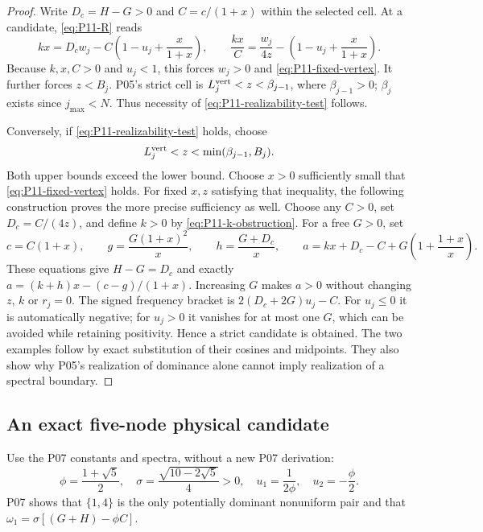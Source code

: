 \documentclass[11pt]{article}
\theoremstyle{definition}
\theoremstyle{remark}
\begin{document}
\begin{proof}
Write $D_c=H-G>0$ and $C=c/(1+x)$ within the selected cell.
At a candidate, \eqref{eq:P11-R} reads
\begin{equation}
 kx=D_cw_j-C\left(1-u_j+\frac{x}{1+x}\right),\qquad
 \frac{kx}{C}=\frac{w_j}{4z}-\left(1-u_j+\frac{x}{1+x}\right).
 \label{eq:P11-k-obstruction}
\end{equation}
Because $k,x,C>0$ and $u_j<1$, this forces $w_j>0$ and
\eqref{eq:P11-fixed-vertex}. It further forces $z<B_j$.
P05's strict cell is
$L_j^{\rm vert}<z<\beta_{j-1}$, where $\beta_{j-1}>0$;
$\beta_j$ exists since $j_{\max}<N$. Thus necessity of
\eqref{eq:P11-realizability-test} follows.

Conversely, if \eqref{eq:P11-realizability-test} holds, choose
\[
 L_j^{\rm vert}<z<\min(\beta_{j-1},B_j).
\]
Both upper bounds exceed the lower bound. Choose $x>0$ sufficiently
small that \eqref{eq:P11-fixed-vertex} holds. For fixed $x,z$
satisfying that inequality, the following construction proves the more
precise sufficiency as well. Choose any $C>0$, set $D_c=C/(4z)$,
and define $k>0$ by \eqref{eq:P11-k-obstruction}. For a free $G>0$,
set
\begin{equation}
 c=C(1+x),\qquad g=\frac{G(1+x)^2}{x},\qquad
 h=\frac{G+D_c}{x},\qquad
 a=kx+D_c-C+G\left(1+\frac{1+x}{x}\right).
 \label{eq:P11-realization}
\end{equation}
These equations give $H-G=D_c$ and exactly
$a=(k+h)x-(c-g)/(1+x)$. Increasing $G$ makes $a>0$
without changing $z$, $k$ or $r_j=0$. The signed frequency bracket
is $2(D_c+2G)u_j-C$. For $u_j\le0$ it is automatically negative;
for $u_j>0$ it vanishes for at most one $G$, which can be avoided
while retaining positivity. Hence a strict candidate is obtained.
The two examples follow by exact substitution of their cosines and
midpoints. They also show why P05's realization of dominance alone
cannot imply realization of a spectral boundary.
\end{proof}

\subsection{An exact five-node physical candidate}
Use the P07 constants and spectra, without a new P07 derivation:
\[
 \phi=\frac{1+\sqrt5}{2},\quad
 \sigma=\frac{\sqrt{10-2\sqrt5}}4>0,\quad
 u_1=\frac1{2\phi},\quad u_2=-\frac\phi2.
\]
P07 shows that $\{1,4\}$ is the only potentially dominant nonuniform
pair and that $\omega_1=\sigma[(G+H)-\phi C]$.
\end{document}
